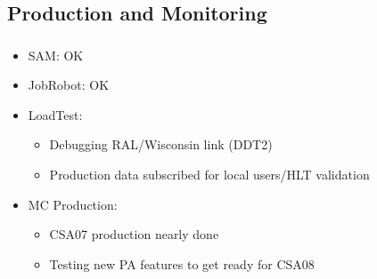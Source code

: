 \documentclass{beamer}
\begin{document}
\subsection{Production and Monitoring}
\begin{frame}
\frametitle{}
\begin{itemize}
    \item SAM: OK
    \item JobRobot: OK
    \item LoadTest:
    \begin{itemize}
        \item Debugging RAL/Wisconsin link (DDT2)
        \item Production data subscribed for local users/HLT validation
    \end{itemize}
    \item MC Production:
    \begin{itemize}
        \item CSA07 production nearly done
        \item Testing new PA features to get ready for CSA08
    \end{itemize}
\end{itemize}
\end{frame}
\end{document}
